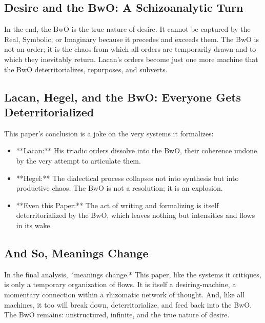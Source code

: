 \documentclass{article}
\begin{document}
\subsection{Desire and the BwO: A Schizoanalytic Turn}

In the end, the BwO is the true nature of desire. It cannot be captured by the Real, Symbolic, or Imaginary because it precedes and exceeds them. The BwO is not an order; it is the chaos from which all orders are temporarily drawn and to which they inevitably return. Lacan’s orders become just one more machine that the BwO deterritorializes, repurposes, and subverts.

\subsection{Lacan, Hegel, and the BwO: Everyone Gets Deterritorialized}

This paper’s conclusion is a joke on the very systems it formalizes:
\begin{itemize}
    \item **Lacan:** His triadic orders dissolve into the BwO, their coherence undone by the very attempt to articulate them.
    \item **Hegel:** The dialectical process collapses not into synthesis but into productive chaos. The BwO is not a resolution; it is an explosion.
    \item **Even this Paper:** The act of writing and formalizing is itself deterritorialized by the BwO, which leaves nothing but intensities and flows in its wake.
\end{itemize}

\subsection{And So, Meanings Change}

In the final analysis, *meanings change.* This paper, like the systems it critiques, is only a temporary organization of flows. It is itself a desiring-machine, a momentary connection within a rhizomatic network of thought. And, like all machines, it too will break down, deterritorialize, and feed back into the BwO. The BwO remains: unstructured, infinite, and the true nature of desire.
\end{document}
